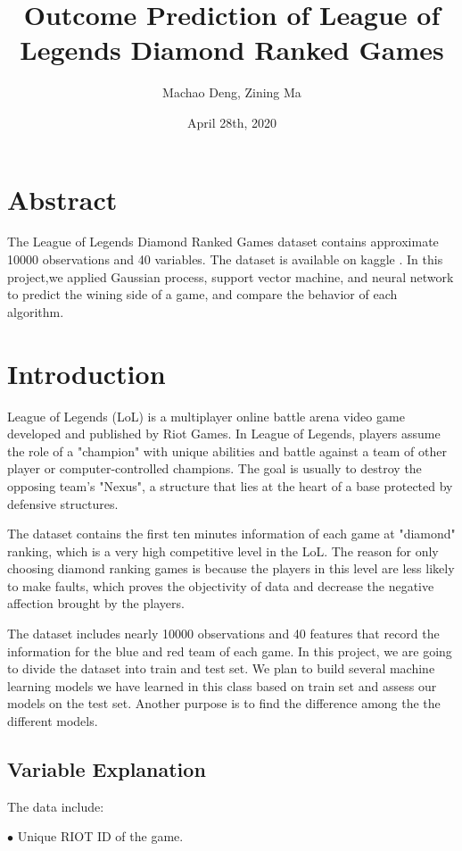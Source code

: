 \documentclass{article}
\title{Outcome Prediction of League of Legends Diamond Ranked Games}
\author{Machao Deng, Zining Ma}
\date{April 28th, 2020}
\begin{document}
\maketitle

\section{Abstract}
The League of Legends Diamond Ranked Games dataset contains approximate 10000 observations and 40 variables. The dataset is available on kaggle \cite{kaggledata}. In this project,we applied Gaussian process, support vector machine, and neural network to predict the wining side of a game, and compare the behavior of each algorithm.

\section{Introduction}
League of Legends (LoL) is a multiplayer online battle arena video game developed and published by Riot Games. In League of Legends, players assume the role of a "champion" with unique abilities and battle against a team of other player or computer-controlled champions. The goal is usually to destroy the opposing team's "Nexus", a structure that lies at the heart of a base protected by defensive structures.

The dataset contains the first ten minutes information of each game at "diamond" ranking, which is a very high competitive level in the LoL. The reason for only choosing diamond ranking games is because the players in this level are less likely to make faults, which proves the objectivity of data and decrease the negative affection brought by the players.

The dataset includes nearly 10000 observations and 40 features that record the information for the blue and red team of each game. In this project, we are going to divide the dataset into train and test set. We plan to build several machine learning models we have learned in this class based on train set and assess our models on the test set. Another purpose is to find the difference among the the different models.

\subsection{Variable Explanation}

The data include:

$\bullet$ Unique RIOT ID of the game.
\end{document}
